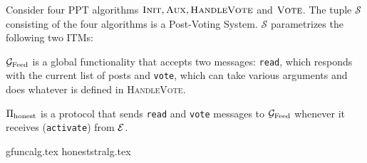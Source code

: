 \begin{definition}
  \label{model:def:pvs}
  Consider four PPT algorithms $\textsc{Init}, \textsc{Aux},
  \textsc{HandleVote}$ and $\textsc{Vote}$. The tuple $\mathcal{S}$ consisting
  of the four algorithms is a Post-Voting System. $\mathcal{S}$ parametrizes the
  following two ITMs:

  $\mathcal{G}_{\mathrm{Feed}}$ is a global functionality that accepts two messages: \texttt{read},
  which responds with the current list of posts and \texttt{vote}, which can
  take various arguments and does whatever is defined in \textsc{HandleVote}.

  $\Pi_{\mathrm{honest}}$ is a protocol that sends \texttt{read} and \texttt{vote}
  messages to $\mathcal{G}_{\mathrm{Feed}}$ whenever it receives (\texttt{activate}) from $\mathcal{E}$.
\end{definition}
{gfuncalg.tex}
{honeststralg.tex}
